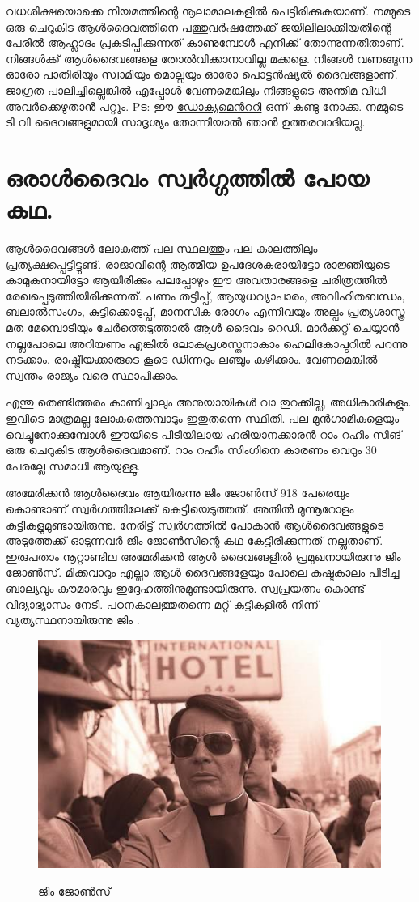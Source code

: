 \documentclass[10pt,a4paper]{report}
\begin{document}
  വധശിക്ഷയൊക്കെ നിയമത്തിന്റെ നൂലാമാലകളിൽ പെട്ടിരിക്കുകയാണ്. നമ്മുടെ ഒരു ചെറുകിട ആൾദൈവത്തിനെ പത്തുവർഷത്തേക്ക് ജയിലിലാക്കിയതിന്റെ പേരിൽ ആഹ്ലാദം പ്രകടിപ്പിക്കുന്നത് കാണുമ്പോൾ എനിക്ക് തോന്നുന്നതിതാണ്. നിങ്ങൾക്ക് ആൾദൈവങ്ങളെ തോൽവിക്കാനാവില്ല മക്കളെ. നിങ്ങൾ വണങ്ങുന്ന ഓരോ പാതിരിയും സ്വാമിയും മൊല്ലയും ഓരോ പൊട്ടൻഷ്യൽ ദൈവങ്ങളാണ്. ജാഗ്രത പാലിച്ചില്ലെങ്കിൽ എപ്പോൾ വേണമെങ്കിലും നിങ്ങളുടെ അന്തിമ വിധി അവർക്കെഴുതാൻ പറ്റും. Pട: ഈ  \href{https://youtu.be/vQ7uz8EYMYo}{ ഡോക്യമെൻററി} ഒന്ന് കണ്ടു നോക്കു. നമ്മുടെ ടി വി ദൈവങ്ങളുമായി സാദൃശ്യം തോന്നിയാൽ ഞാൻ ഉത്തരവാദിയല്ല.  
%

\section{ഒരാൾദൈവം സ്വർഗ്ഗത്തിൽ പോയ കഥ.}  

 ആൾദൈവങ്ങൾ ലോകത്ത് പല സ്ഥലത്തും പല കാലത്തിലും പ്രത്യക്ഷപ്പെട്ടിട്ടുണ്ട്. രാജാവിന്റെ ആത്മീയ ഉപദേശകരായിട്ടോ രാജ്ഞിയുടെ കാമുകനായിട്ടോ ആയിരിക്കും പലപ്പോഴും ഈ അവതാരങ്ങളെ ചരിത്രത്തിൽ രേഖപ്പെടുത്തിയിരിക്കുന്നത്. പണം തട്ടിപ്പ്, ആയുധവ്യാപാരം, അവിഹിതബന്ധം, ബലാൽസംഗം, കുട്ടിക്കൊടുപ്പ്, മാനസിക രോഗം എന്നിവയും അല്പം പ്രത്യശാസ്ത്ര  മത മേമ്പൊടിയും ചേർത്തെടുത്താൽ ആൾ ദൈവം റെഡി. മാർക്കറ്റ് ചെയ്യാൻ നല്ലപോലെ അറിയണം എങ്കിൽ ലോകപ്രശസ്തനാകാം ഹെലികോപ്ടറിൽ പറന്നു നടക്കാം. രാഷ്ട്രീയക്കാരുടെ കൂടെ ഡിന്നറും ലഞ്ചും കഴിക്കാം. വേണമെങ്കിൽ സ്വന്തം രാജ്യം വരെ സ്ഥാപിക്കാം.
 
  എന്തു തെണ്ടിത്തരം കാണിച്ചാലും അനുയായികൾ വാ തുറക്കില്ല, അധികാരികളും. ഇവിടെ മാത്രമല്ല ലോകത്തെമ്പാടും ഇതുതന്നെ സ്ഥിതി. പല മുൻഗാമികളെയും വെച്ചുനോക്കുമ്പോൾ   ഈയിടെ പിടിയിലായ ഹരിയാനക്കാരൻ   റാം റഹീം സിങ് ഒരു ചെറുകിട ആൾദൈവമാണ്. റാം റഹീം സിംഗിനെ കാരണം വെറും 30 പേരല്ലേ സമാധി ആയുള്ളൂ. 
  
  അമേരിക്കൻ ആൾദൈവം ആയിരുന്നു ജിം ജോൺസ് 918 പേരെയും കൊണ്ടാണ് സ്വർഗത്തിലേക്ക് കെട്ടിയെടുത്തത്. അതിൽ മുന്നൂറോളം കുട്ടികളുമുണ്ടായിരുന്നു. നേരിട്ട് സ്വർഗത്തിൽ പോകാൻ ആൾദൈവങ്ങളുടെ അടുത്തേക്ക് ഓടുന്നവർ ജിം ജോൺസിന്റെ കഥ കേട്ടിരിക്കുന്നത് നല്ലതാണ്. ഇരുപതാം നൂറ്റാണ്ടില അമേരിക്കൻ ആൾ ദൈവങ്ങളിൽ പ്രമുഖനായിരുന്നു ജിം ജോൺസ്. മിക്കവാറും എല്ലാ ആൾ ദൈവങ്ങളേയും പോലെ കഷ്ടകാലം പിടിച്ച ബാല്യവും കൗമാരവും ഇദ്ദേഹത്തിനുമുണ്ടായിരുന്നു. സ്വപ്രയത്നം കൊണ്ട് വിദ്യാഭ്യാസം നേടി. പഠനകാലത്തുതന്നെ മറ്റ് കുട്ടികളിൽ നിന്ന് വ്യത്യസ്ഥനായിരുന്നു ജിം . 
\begin{figure}[H]
  \center
\includegraphics[scale=.25]{images/aal2} 
\label{aal2}
\caption{ ജിം ജോൺസ്  }
\end{figure}
  
\end{document}
